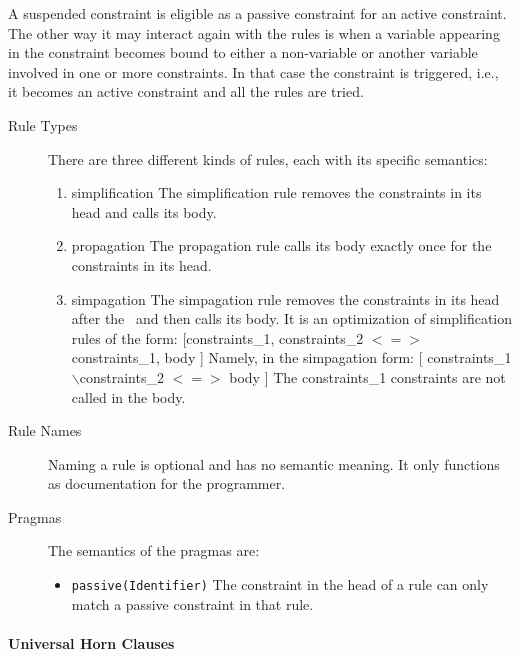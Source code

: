 \documentclass[thesis-solanki.tex]{subfiles}
\begin{document}
A suspended constraint is eligible as a passive constraint for an active constraint.
The other way it may interact again with the rules is when a variable appearing in the constraint becomes bound to
either a non-variable or another variable involved in one or more constraints.
In that case the constraint is triggered, i.e.,
it becomes an active constraint and all the rules are tried.
\begin{description}

\item [Rule Types]
  There are three different kinds of rules, each with its specific semantics:
\begin{enumerate}

\item simplification
The simplification rule removes the constraints in its head and calls its body.

\item propagation
The propagation rule calls its body exactly once for the constraints in its head.

\item simpagation
The simpagation rule removes the constraints in its head after the \ and then calls its body. It is an optimization of simplification rules 
of the form: [constraints\_1, constraints\_2 $<=>$ constraints\_1, body ] Namely, in the simpagation form: [ constraints\_1 
$\backslash$constraints\_2 $<=>$ body ] The constraints\_1 constraints are not called in the body.

\end{enumerate}


\item [Rule Names] Naming a rule is optional and has no semantic meaning. It only functions as documentation for the programmer.

\item [Pragmas] The semantics of the pragmas are:

  \begin{itemize}
  \item \Verb!passive(Identifier)!
    The constraint in the head of a rule 
    can only match a passive constraint in that rule.  
  \end{itemize}
\end{description}

\paragraph{Universal Horn Clauses}
\end{document}
